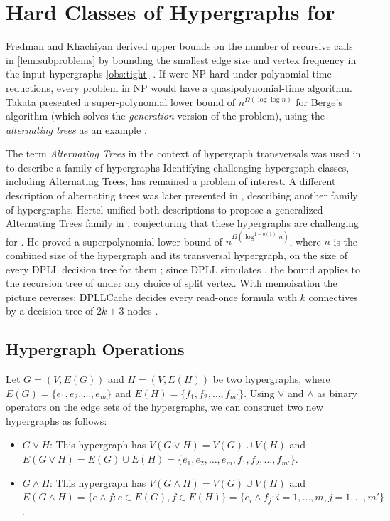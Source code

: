 \chapter{Hard Classes of Hypergraphs for \FKA}

Fredman and Khachiyan derived upper bounds on the number of recursive calls in \ref{lem:subproblems} by bounding the smallest edge size and vertex frequency in the input hypergraphs \ref{obs:tight} \cite{FK96}. If \TransHyp{} were NP-hard under polynomial-time reductions, every problem in NP would have a quasipolynomial-time algorithm. Takata presented a super-polynomial lower bound of $n^{\Omega(\log\log n)}$ for Berge's algorithm (which solves the \emph{generation}-version of the problem), using the \emph{alternating trees} as an example \cite{Tak08}.

The term \emph{Alternating Trees} in the context of hypergraph transversals was used in   to describe a family of hypergraphs   Identifying challenging hypergraph classes, including Alternating Trees, has remained a problem of interest. A different description of alternating trees was later presented in \cite{Tak08}, describing another family of hypergraphs. Hertel unified both descriptions to propose a generalized Alternating Trees family in \cite{Her04}, conjecturing that these hypergraphs are challenging for \FKA{}. He proved a superpolynomial lower bound of $n^{\Omega(\log^{1-o(1)}n)}$, where $n$ is the combined size of the hypergraph and its transversal hypergraph, on the size of every DPLL decision tree for them \cite[Thm.~4.3.6]{Her04}; since DPLL simulates \FKA{} \cite[Thm.~4.1.7]{Her04}, the bound applies to the recursion tree of \FKA{} under any choice of split vertex. With memoisation the picture reverses: DPLLCache decides every read-once formula with $k$ connectives by a decision tree of $2k+3$ nodes \cite[Thm.~4.4.1]{Her04}.

\section{Hypergraph Operations}

Let $G=(V,E(G))$ and $H=(V,E(H))$ be two hypergraphs, where $E(G)=\{e_1,e_2,\dots,e_m\}$ and $E(H)=\{f_1,f_2,\dots,f_{m'}\}$. Using $\vee$ and $\wedge$ as binary operators on the edge sets of the hypergraphs, we can construct two new hypergraphs as follows:
\begin{itemize}
\item $G\vee H$: This hypergraph has $V(G\vee H)=V(G)\cup V(H)$ and $E(G\vee H)=E(G)\cup E(H)=\{e_1,e_2,\dots,e_m,f_1,f_2,\dots,f_{m'}\}$.
\item $G\wedge H$: This hypergraph has $V(G\wedge H)=V(G)\cup V(H)$ and $E(G\wedge H)=\{e\wedge f:e\in E(G),f\in E(H)\}=\{e_i\wedge f_j:i=1,\dots,m,j=1,\dots,m'\}$.
\end{itemize}

